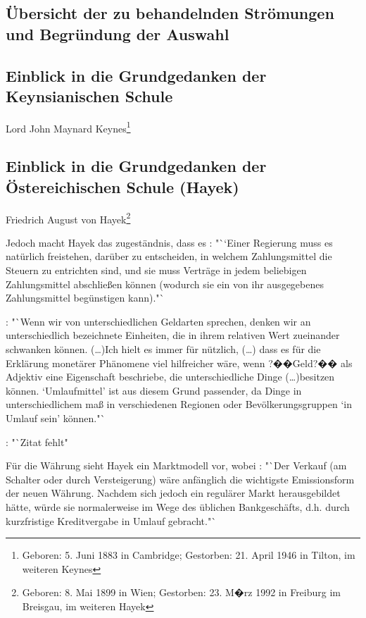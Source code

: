 \documentclass[
        onecolumn,
        a4paper,
        abstracton,
        parskip=half
        ,final
        ]{scrartcl}
\begin{document}
\subsection{{\"U}bersicht der zu behandelnden Str{\"o}mungen und Begr{\"u}ndung der Auswahl}

\subsection{Einblick in die Grundgedanken der Keynsianischen Schule}

Lord John Maynard Keynes\footnote[14]{Geboren:  5. Juni 1883 in Cambridge; Gestorben: 21. April 1946 in Tilton, im weiteren Keynes}


\subsection{Einblick in die Grundgedanken der {\"O}stereichischen Schule (Hayek)}


Friedrich August von Hayek\footnote[15]{Geboren: 8. Mai 1899 in Wien; Gestorben: 23. M�rz 1992 in Freiburg im Breisgau, im weiteren Hayek}

Jedoch macht Hayek das zugest{\"a}ndnis, dass es \citep[vgl.][S.23]{Hayek1977}: "``Einer Regierung muss es nat{\"u}rlich freistehen, dar{\"u}ber zu entscheiden, in welchem Zahlungsmittel die Steuern zu entrichten sind, und sie muss Vertr{\"a}ge in jedem beliebigen Zahlungsmittel abschlie{\ss}en k{\"o}nnen (wodurch sie ein von ihr ausgegebenes Zahlungsmittel beg{\"u}nstigen kann)."`



\citep[vgl.][S.40f]{Hayek1977}: "`Wenn wir von unterschiedlichen Geldarten sprechen, denken wir an unterschiedlich bezeichnete Einheiten, die in ihrem relativen Wert zueinander schwanken k{\"o}nnen. (\ldots)Ich hielt es immer f{\"u}r n{\"u}tzlich, (\ldots) dass es f{\"u}r die Erkl{\"a}rung monet{\"a}rer Ph{\"a}nomene viel hilfreicher w{\"a}re, wenn ?��Geld?�� als Adjektiv eine Eigenschaft beschriebe, die unterschiedliche Dinge (\ldots)besitzen k{\"o}nnen. `Umlaufmittel' ist aus diesem Grund passender, da Dinge in unterschiedlichem ma{\ss} in verschiedenen Regionen oder Bev{\"o}lkerungsgruppen `in Umlauf sein' k{\"o}nnen."`

\citep[vgl.][S.43]{Hayek1977}: "`Zitat fehlt"

F{\"u}r die W{\"a}hrung sieht Hayek ein Marktmodell vor, wobei \citep[vgl.][S.31]{Hayek1977}: "`Der Verkauf (am Schalter oder durch Versteigerung) w{\"a}re anf{\"a}nglich die wichtigste Emissionsform der neuen W{\"a}hrung. Nachdem sich jedoch ein regul{\"a}rer Markt herausgebildet h{\"a}tte, w{\"u}rde sie normalerweise im Wege des {\"u}blichen Bankgesch{\"a}fts, d.h. durch kurzfristige Kreditvergabe in Umlauf gebracht."`
\end{document}
